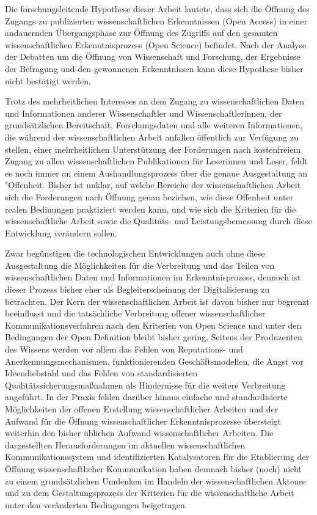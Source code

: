 Die forschungsleitende Hypothese dieser Arbeit lautete, dass sich die Öffnung des Zugangs zu publizierten wissenschaftlichen Erkenntnissen (Open Access) in einer andauernden Übergangsphase zur Öffnung des Zugriffs auf den gesamten wissenschaftlichen Erkenntnisprozess (Open Science) befindet. Nach der Analyse der Debatten um die Öffnung von Wissenschaft und Forschung, der Ergebnisse der Befragung und den gewonnenen Erkenntnissen kann diese Hypothese bisher nicht bestätigt werden.

Trotz des mehrheitlichen Interesses an dem Zugang zu wissenschaftlichen Daten und Informationen anderer Wissenschaftler und Wissenschaftlerinnen, der grundsätzlichen Bereitschaft, Forschungsdaten und alle weiteren Informationen, die während der wissenschaftlichen Arbeit anfallen öffentlich zur Verfügung zu stellen, einer mehrheitlichen Unterstützung der Forderungen nach kostenfreiem Zugang zu allen wissenschaftlichen Publikationen für Leserinnen und Leser, fehlt es noch immer an einem Aushandlungsprozess über die genaue Ausgestaltung an "Offenheit. Bisher ist unklar, auf welche Bereiche der wissenschaftlichen Arbeit sich die Forderungen nach Öffnung genau beziehen, wie diese Offenheit unter realen Bedinungen praktiziert werden kann, und wie sich die Kriterien für die wissenschaftliche Arbeit sowie die Qualitäts- und Leistungsbemessung durch diese Entwicklung verändern sollen.

Zwar begünstigen die technologischen Entwicklungen auch ohne diese Ausgestaltung die Möglichkeiten für die Verbreitung und das Teilen von wissenschaftlichen Daten und Informationen im Erkenntnisprozess, dennoch ist dieser Prozess bisher eher als Begleiterscheinung der Digitalisierung zu betrachten. Der Kern der wissenschaftlichen Arbeit ist davon bisher nur begrenzt beeinflusst und die tatsächliche Verbreitung offener wissenschaftlicher Kommunikationsverfahren nach den Kriterien von Open Science und unter den Bedingungen der Open Definition bleibt bisher gering. Seitens der Produzenten des Wissens werden vor allem das Fehlen von Reputations- und Anerkennungsmechanismen, funktionierenden Geschäftsmodellen, die Angst vor Ideendiebstahl und das Fehlen von standardisierten Qualitätssicherungsmaßnahmen als Hindernisse für die weitere Verbreitung angeführt. In der Praxis fehlen darüber hinaus einfache und standardisierte Möglichkeiten der offenen Erstellung wissenschaftlicher Arbeiten und der Aufwand für die Öffnung wissenschaftlicher Erkenntnisprozesse übersteigt weiterhin den bisher üblichen Aufwand wissenschaftlicher Arbeiten. Die dargestellten Herausforderungen im aktuellen wissenschaftlichen Kommunikationssystem und identifizierten Katalysatoren für die Etablierung der Öffnung wissenschaftlicher Kommunikation haben demnach bisher (noch) nicht zu einem grundsätzlichen Umdenken im Handeln der wissenschaftlichen Akteure und zu dem Gestaltungsprozess der Kriterien für die wissenschaftliche Arbeit unter den veränderten Bedingungen beigetragen.

